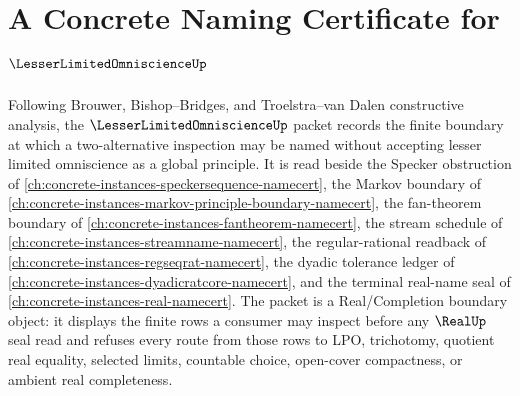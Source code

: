 \chapter{A Concrete Naming Certificate for $\LesserLimitedOmniscienceUp$}
\label{ch:concrete-instances-lesser-limited-omniscience-namecert}

Following Brouwer, Bishop--Bridges, and Troelstra--van Dalen constructive analysis, the $\LesserLimitedOmniscienceUp$ packet records the finite boundary at which a two-alternative inspection may be named without accepting lesser limited omniscience as a global principle. It is read beside the Specker obstruction of \autoref{ch:concrete-instances-speckersequence-namecert}, the Markov boundary of \autoref{ch:concrete-instances-markov-principle-boundary-namecert}, the fan-theorem boundary of \autoref{ch:concrete-instances-fantheorem-namecert}, the stream schedule of \autoref{ch:concrete-instances-streamname-namecert}, the regular-rational readback of \autoref{ch:concrete-instances-regseqrat-namecert}, the dyadic tolerance ledger of \autoref{ch:concrete-instances-dyadicratcore-namecert}, and the terminal real-name seal of \autoref{ch:concrete-instances-real-namecert}. The packet is a Real/Completion boundary object: it displays the finite rows a consumer may inspect before any $\RealUp$ seal read and refuses every route from those rows to LPO, trichotomy, quotient real equality, selected limits, countable choice, open-cover compactness, or ambient real completeness.

